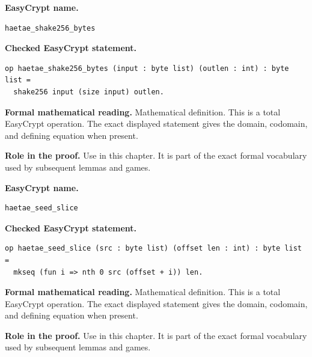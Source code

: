 \begin{formaldefinition}
\noindent\textbf{EasyCrypt name.}
\begin{lstlisting}[language=EasyCrypt,basicstyle=\ttfamily\scriptsize]
haetae_shake256_bytes
\end{lstlisting}
\noindent\textbf{Checked EasyCrypt statement.}
\begin{lstlisting}[language=EasyCrypt,basicstyle=\ttfamily\scriptsize]
op haetae_shake256_bytes (input : byte list) (outlen : int) : byte list =
  shake256 input (size input) outlen.
\end{lstlisting}
\noindent\textbf{Formal mathematical reading.}
Mathematical definition. This is a total EasyCrypt operation.  The exact displayed statement gives the domain, codomain, and defining equation when present.

\noindent\textbf{Role in the proof.}
Use in this chapter. It is part of the exact formal vocabulary used by subsequent lemmas and games.

\end{formaldefinition}

\begin{formaldefinition}
\noindent\textbf{EasyCrypt name.}
\begin{lstlisting}[language=EasyCrypt,basicstyle=\ttfamily\scriptsize]
haetae_seed_slice
\end{lstlisting}
\noindent\textbf{Checked EasyCrypt statement.}
\begin{lstlisting}[language=EasyCrypt,basicstyle=\ttfamily\scriptsize]
op haetae_seed_slice (src : byte list) (offset len : int) : byte list =
  mkseq (fun i => nth 0 src (offset + i)) len.
\end{lstlisting}
\noindent\textbf{Formal mathematical reading.}
Mathematical definition. This is a total EasyCrypt operation.  The exact displayed statement gives the domain, codomain, and defining equation when present.

\noindent\textbf{Role in the proof.}
Use in this chapter. It is part of the exact formal vocabulary used by subsequent lemmas and games.

\end{formaldefinition}

